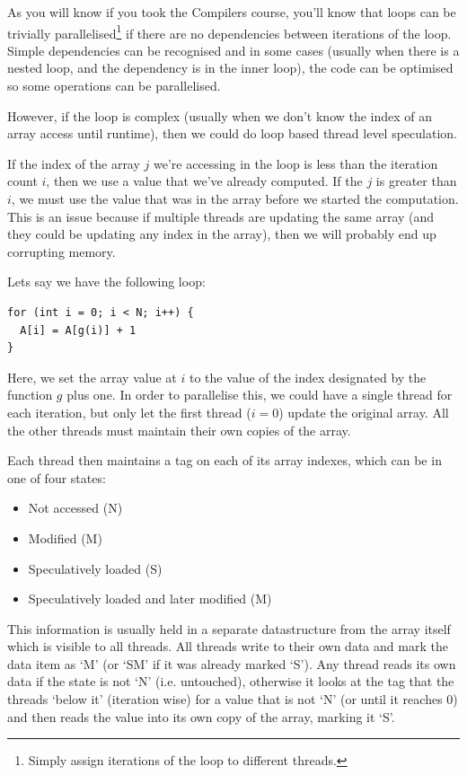 As you will know if you took the Compilers course, you'll know that
loops can be trivially parallelised\footnote{Simply assign iterations
of the loop to different threads.} if there are no dependencies
between iterations of the loop. Simple dependencies can be recognised
and in some cases (usually when there is a nested loop, and the
dependency is in the inner loop), the code can be optimised so some
operations can be parallelised.

However, if the loop is complex (usually when we don't know the index
of an array access until runtime), then we could do loop based thread
level speculation.

If the index of the array $j$ we're accessing in the loop is less than
the iteration count $i$, then we use a value that we've already
computed. If the $j$ is greater than $i$, we must use the value that
was in the array before we started the computation. This is an issue
because if multiple threads are updating the same array (and they
could be updating any index in the array), then we will probably end
up corrupting memory.

Lets say we have the following loop:

\begin{verbatim}
for (int i = 0; i < N; i++) {
  A[i] = A[g(i)] + 1
}
\end{verbatim}

Here, we set the array value at $i$ to the value of the index
designated by the function $g$ plus one. In order to parallelise this,
we could have a single thread for each iteration, but only let the
first thread ($i=0$) update the original array. All the other threads
must maintain their own copies of the array.

Each thread then maintains a tag on each of its array indexes, which
can be in one of four states:

\begin{itemize}
\item Not accessed (N)
\item Modified (M)
\item Speculatively loaded (S)
\item Speculatively loaded and later modified (M)
\end{itemize}

This information is usually held in a separate datastructure from the
array itself which is visible to all threads. All threads write to
their own data and mark the data item as `M' (or `SM' if it was
already marked `S'). Any thread reads its own data if the state is not
`N' (i.e. untouched), otherwise it looks at the tag that the threads
`below it' (iteration wise) for a value that is not `N' (or until it
reaches 0) and then reads the value into its own copy of the array,
marking it `S'.

